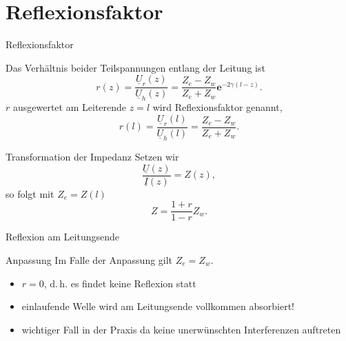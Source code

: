 \documentclass{beamer}
\begin{document}
\section{Reflexionsfaktor}


\begin{frame}{Reflexionsfaktor}
\begin{figure}[!htb]
    \begin{center}
        
    \end{center}
\end{figure}

Das Verhältnis beider Teilspannungen entlang der Leitung ist
\[
r(z) = \frac{\underline{U}_{r}(z)}{\underline{U}_{h}(z)} =
       \frac{Z_{e}-Z_{w}}{Z_{e}+Z_{w}} \mathbf{e}^{-2 \gamma (l-z)}.
\]
$r$ ausgewertet am Leiterende $z = l$ wird Reflexionsfaktor genannt,
\begin{equation}
    r(l) = \frac{\underline{U}_{r}(l)}{\underline{U}_{h}(l)} = \frac{Z_{e}-Z_{w}}{Z_{e}+Z_{w}} \label{eq:RFactor}.
\end{equation}

\end{frame}


\begin{frame}{Transformation der Impedanz}
Setzen wir
\[
\frac{\underline{U}(z)}{\underline{I}(z)} = Z(z),
\]
so folgt mit $Z_{e} = Z(l)$
\[
Z = \frac{1 + r}{1 - r} Z_{w}.
\]
\end{frame}


\begin{frame}{Reflexion am Leitungsende}

\begin{figure}[!htb]
    \begin{center}
        
    \end{center}
\end{figure}

\end{frame}


\begin{frame}{Anpassung}
Im Falle der Anpassung gilt $Z_{e} = Z_{w}$.
\begin{itemize}
    \item <1-> $r = 0$, d.\,h. es findet keine Reflexion statt
    \item <2-> einlaufende Welle wird am Leitungsende vollkommen absorbiert!
    \item <3-> wichtiger Fall in der Praxis da keine unerwünschten Interferenzen auftreten
\end{itemize}
\end{frame}
\end{document}
